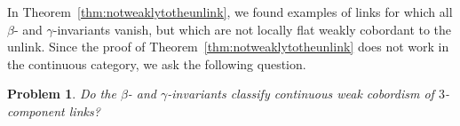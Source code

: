 \documentclass[a4paper, 11pt]{amsart}
\newcommand{\red}{\textcolor{red}}
\newcommand{\chris}[1]{\red{[Chris] #1}}
\newtheorem{problem}[theorem]{Problem}
\theoremstyle{definition}
\begin{document}
In Theorem~\ref{thm:notweaklytotheunlink}, we found examples of links for which all $\beta$- and $\gamma$-invariants vanish, but which are not locally flat weakly cobordant to the unlink. Since the proof of Theorem~\ref{thm:notweaklytotheunlink} does not work in the continuous category, we ask the following question.

\begin{problem}\label{problem: classify topological weak cobordism}
Do the $\beta$- and $\gamma$-invariants classify continuous weak cobordism of $3$-component links?
\end{problem}












\end{document}
